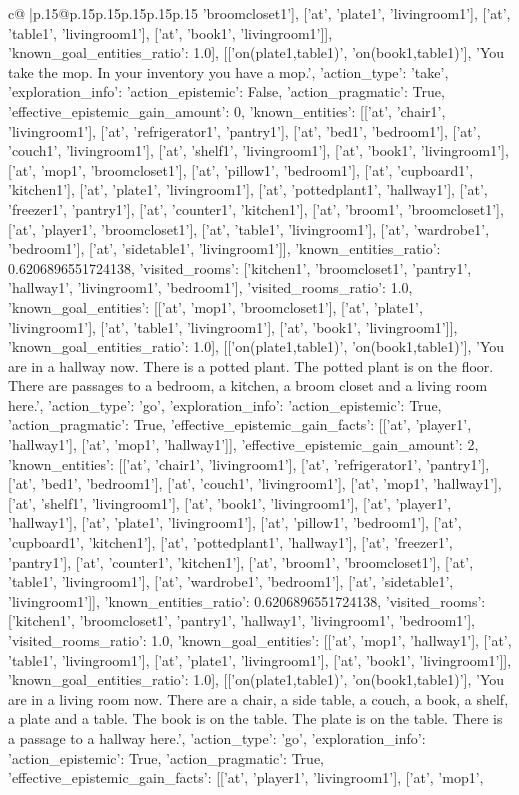 \documentclass{article}
\begin{document}
{\begin{supertabular}{c@{$\;$}|p{.15\linewidth}@{}p{.15\linewidth}p{.15\linewidth}p{.15\linewidth}p{.15\linewidth}p{.15\linewidth}}
{{{'broomcloset1'], ['at', 'plate1', 'livingroom1'], ['at', 'table1', 'livingroom1'], ['at', 'book1', 'livingroom1']], 'known_goal_entities_ratio': 1.0}}], [['on(plate1,table1)', 'on(book1,table1)'], 'You take the mop. In your inventory you have a mop.', {'action_type': 'take', 'exploration_info': {'action_epistemic': False, 'action_pragmatic': True, 'effective_epistemic_gain_amount': 0, 'known_entities': [['at', 'chair1', 'livingroom1'], ['at', 'refrigerator1', 'pantry1'], ['at', 'bed1', 'bedroom1'], ['at', 'couch1', 'livingroom1'], ['at', 'shelf1', 'livingroom1'], ['at', 'book1', 'livingroom1'], ['at', 'mop1', 'broomcloset1'], ['at', 'pillow1', 'bedroom1'], ['at', 'cupboard1', 'kitchen1'], ['at', 'plate1', 'livingroom1'], ['at', 'pottedplant1', 'hallway1'], ['at', 'freezer1', 'pantry1'], ['at', 'counter1', 'kitchen1'], ['at', 'broom1', 'broomcloset1'], ['at', 'player1', 'broomcloset1'], ['at', 'table1', 'livingroom1'], ['at', 'wardrobe1', 'bedroom1'], ['at', 'sidetable1', 'livingroom1']], 'known_entities_ratio': 0.6206896551724138, 'visited_rooms': ['kitchen1', 'broomcloset1', 'pantry1', 'hallway1', 'livingroom1', 'bedroom1'], 'visited_rooms_ratio': 1.0, 'known_goal_entities': [['at', 'mop1', 'broomcloset1'], ['at', 'plate1', 'livingroom1'], ['at', 'table1', 'livingroom1'], ['at', 'book1', 'livingroom1']], 'known_goal_entities_ratio': 1.0}}], [['on(plate1,table1)', 'on(book1,table1)'], 'You are in a hallway now. There is a potted plant. The potted plant is on the floor. There are passages to a bedroom, a kitchen, a broom closet and a living room here.', {'action_type': 'go', 'exploration_info': {'action_epistemic': True, 'action_pragmatic': True, 'effective_epistemic_gain_facts': [['at', 'player1', 'hallway1'], ['at', 'mop1', 'hallway1']], 'effective_epistemic_gain_amount': 2, 'known_entities': [['at', 'chair1', 'livingroom1'], ['at', 'refrigerator1', 'pantry1'], ['at', 'bed1', 'bedroom1'], ['at', 'couch1', 'livingroom1'], ['at', 'mop1', 'hallway1'], ['at', 'shelf1', 'livingroom1'], ['at', 'book1', 'livingroom1'], ['at', 'player1', 'hallway1'], ['at', 'plate1', 'livingroom1'], ['at', 'pillow1', 'bedroom1'], ['at', 'cupboard1', 'kitchen1'], ['at', 'pottedplant1', 'hallway1'], ['at', 'freezer1', 'pantry1'], ['at', 'counter1', 'kitchen1'], ['at', 'broom1', 'broomcloset1'], ['at', 'table1', 'livingroom1'], ['at', 'wardrobe1', 'bedroom1'], ['at', 'sidetable1', 'livingroom1']], 'known_entities_ratio': 0.6206896551724138, 'visited_rooms': ['kitchen1', 'broomcloset1', 'pantry1', 'hallway1', 'livingroom1', 'bedroom1'], 'visited_rooms_ratio': 1.0, 'known_goal_entities': [['at', 'mop1', 'hallway1'], ['at', 'table1', 'livingroom1'], ['at', 'plate1', 'livingroom1'], ['at', 'book1', 'livingroom1']], 'known_goal_entities_ratio': 1.0}}], [['on(plate1,table1)', 'on(book1,table1)'], 'You are in a living room now. There are a chair, a side table, a couch, a book, a shelf, a plate and a table. The book is on the table. The plate is on the table. There is a passage to a hallway here.', {'action_type': 'go', 'exploration_info': {'action_epistemic': True, 'action_pragmatic': True, 'effective_epistemic_gain_facts': [['at', 'player1', 'livingroom1'], ['at', 'mop1', }}}
\end{supertabular}}
\end{document}
